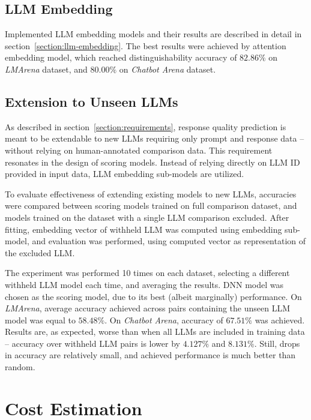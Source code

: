 \documentclass[a4paper,11pt,twoside]{report}
\theoremstyle{definition}
\begin{document}
\subsection{LLM Embedding}

Implemented LLM embedding models and their results are described in detail in section~\ref{section:llm-embedding}. The best results were achieved by attention embedding model, which reached distinguishability accuracy of $82.86 \%$ on \textit{LMArena} dataset, and $80.00 \%$ on \textit{Chatbot Arena} dataset. 

\subsection{Extension to Unseen LLMs}

As described in section~\ref{section:requirements}, response quality prediction is meant to be extendable to new LLMs requiring only prompt and response data -- without relying on human-annotated comparison data. This requirement resonates in the design of scoring models. Instead of relying directly on LLM ID provided in input data, LLM embedding sub-models are utilized.

To evaluate effectiveness of extending existing models to new LLMs, accuracies were compared between scoring models trained on full comparison dataset, and models trained on the dataset with a single LLM comparison excluded. After fitting, embedding vector of withheld LLM was computed using embedding sub-model, and evaluation was performed, using computed vector as representation of the excluded LLM.

The experiment was performed 10 times on each dataset, selecting a different withheld LLM model each time, and averaging the results. DNN model was chosen as the scoring model, due to its best (albeit marginally) performance. On \textit{LMArena}, average accuracy achieved across pairs containing the unseen LLM model was equal to $58.48 \%$. On \textit{Chatbot Arena}, accuracy of $67.51 \%$ was achieved. Results are, as expected, worse than when all LLMs are included in training data -- accuracy over withheld LLM pairs is lower by $4.127 \%$ and $8.131 \%$. Still, drops in accuracy are relatively small, and achieved performance is much better than random.

\section{Cost Estimation}
\end{document}
